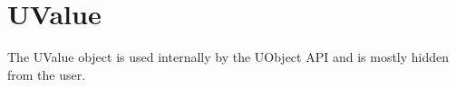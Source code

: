 \section{UValue}


The UValue object is used internally by the UObject API and is mostly
hidden from the user.


